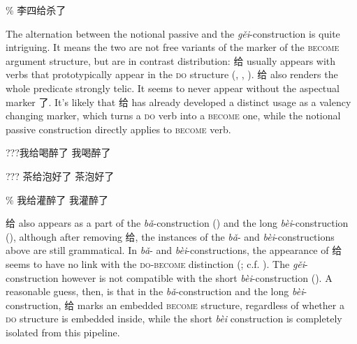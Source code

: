 \documentclass[UTF8, a4paper, oneside, scheme=plain, 12pt]{ctexrep}
\newcommand{\form}[1]{\emph{#1}}
\newcommand*{\category}[1]{\textsc{#1}}
\begin{document}
\begin{exe}
    \ex\label{ex:verb-phrase.gei.1} \% 李四给杀了
\end{exe}

The alternation between the notional passive and the \form{gěi}-construction 
is quite intriguing.
It means the two are not free variants of the marker of the \category{become} argument structure,
but are in contrast distribution:
给 usually appears with verbs that prototypically appear in the \category{do} structure
(,
,
).
给 also renders the whole predicate strongly telic.
It seems to never appear without the aspectual marker 了.
It's likely that 给 has already developed a distinct usage 
as a valency changing marker, 
which turns a \category{do} verb into a \category{become} one,
while the notional passive construction directly applies to \category{become} verb.

\begin{exe}
    \ex\label{ex:verb-phrase.gei.alternation-1} \begin{xlist}
        \ex ???我给喝醉了
        \ex 我喝醉了
    \end{xlist}
    \ex\label{ex:verb-phrase.gei.alternation-2} \begin{xlist}
        \ex ??? 茶给泡好了
        \ex 茶泡好了
    \end{xlist}
    \ex\label{ex:verb-phrase.gei.alternation-3} \begin{xlist}
        \ex \% 我给灌醉了
        \ex *我灌醉了
    \end{xlist}
\end{exe}

给 also appears as a part of the \form{bǎ}-construction
()
and the long \form{bèi}-construction
(),
although after removing 给,
the instances of the \form{bǎ}- and \form{bèi}-constructions above 
are still grammatical.
In \form{bǎ}- and \form{bèi}-constructions, 
the appearance of 给 seems to have no link 
with the \category{do}-\category{become} distinction
(; c.f. ).
The \form{gěi}-construction however is not compatible 
with the short \form{bèi}-construction
().
A reasonable guess, then, 
is that in the \form{bǎ}-construction
and the long \form{bèi}-construction,
给 marks an embedded \category{become} structure,
regardless of whether a \category{do} structure is embedded inside,
while the short \form{bèi} construction is completely isolated 
from this pipeline.
\end{document}
